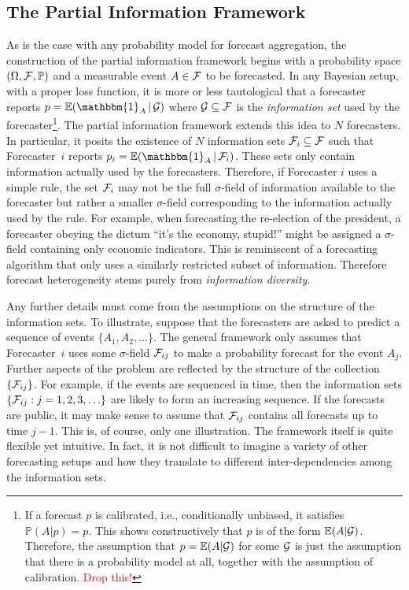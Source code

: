 \documentclass[12pt]{article}
\renewcommand{\P}{\mathbb{P}}
\newcommand{\E}{\mathbb{E}}
\theoremstyle{definition}
\theoremstyle{definition}
\def\one{\mathbbm{1}}
\def\F{{\cal F}}
\def\G{{\cal G}}
\def\P{{\mathbb P}}
\def\E{{\mathbb E}}
\def\|{\, | \,}
\begin{document}
\subsection{The Partial Information Framework}
\label{PIFintro}
As is the case with any probability model for forecast aggregation, the construction  of the partial information framework begins with
 a probability space $(\Omega, \F , \P)$ and a
measurable event $A \in \F$ to be forecasted.  In any Bayesian setup,
with a proper loss function, it is more or less tautological that a
forecaster reports $p = \E (\one_A \| \G)$ where $\G \subseteq \F$ is
the \textit{information set} used by the forecaster\footnote{If a forecast $p$ is calibrated, i.e., conditionally unbiased, it satisfies $\P(A | p) = p$. This shows constructively that $p$ is of the form $\E(A | \G)$. Therefore, the assumption that $p =  \E(A | \G)$ for some $\G$ is just the assumption that there is a probability model at all, together with the assumption of calibration. \textcolor{red}{Drop this!}}.  The
partial information framework extends this idea to $N$
forecasters. In particular, it posits the existence of $N$
information sets $\F_i \subseteq \F$ such that Forecaster~$i$
reports $p_i = \E (\one_A \| \F_i)$. These sets only contain information actually used by the
forecasters. Therefore, if Forecaster $i$ uses a simple rule, the set $\F_i$ may not be the full $\sigma$-field of
information available to the forecaster but rather a smaller
$\sigma$-field corresponding to the information actually used by the
rule.  For example, when forecasting the re-election of the president,  a forecaster obeying the dictum ``it's the economy,
stupid!''  might be assigned a $\sigma$-field containing only economic
indicators.  This is reminiscent of a forecasting algorithm that only uses
a similarly restricted subset of information. Therefore
forecast heterogeneity stems purely from
\textit{information diversity}.  

Any further details must come from the
assumptions on the structure of the information sets. To illustrate, suppose that the forecasters are asked to predict a sequence of events
$\{ A_1, A_2 , \ldots \}$. The general framework only assumes that
Forecaster~$i$ uses some $\sigma$-field $\F_{ij}$ to make a
probability forecast for the event $A_j$.  Further aspects of the problem
are reflected by the structure of the collection $\{ \F_{ij} \}$.  For
example, if the events are sequenced in time, then the information
sets $\{ \F_{ij} : j = 1 , 2, 3, \ldots \}$ are likely to form an
increasing sequence.  If the forecasts are public, it may make sense
to assume that $\F_{ij}$ contains all forecasts up to time $j-1$.
This is, of course, only one illustration. The framework itself is quite flexible
yet intuitive. In fact, it is not difficult to imagine a variety
of other forecasting setups and how they translate to
different inter-dependencies among the information sets.
\end{document}
